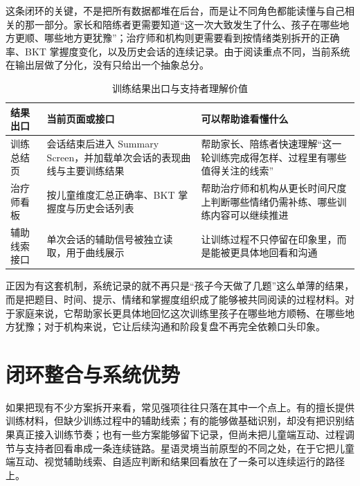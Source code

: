 这条闭环的关键，不是把所有数据都堆在后台，而是让不同角色都能读懂与自己相关的那一部分。家长和陪练者更需要知道“这一次大致发生了什么、孩子在哪些地方更顺、哪些地方更犹豫”；治疗师和机构则更需要看到按情绪类别拆开的正确率、BKT 掌握度变化，以及历史会话的连续记录。由于阅读重点不同，当前系统在输出层做了分化，没有只给出一个抽象总分。

\begin{table}[H]
\centering
\caption{训练结果出口与支持者理解价值}
\small
\begin{tabularx}{0.96\textwidth}{>{\raggedright\arraybackslash}p{} >{\raggedright\arraybackslash}p{} X}
\toprule
结果出口 & 当前页面或接口 & 可以帮助谁看懂什么 \\
\midrule
训练总结页 & 会话结束后进入 Summary Screen，并加载单次会话的表现曲线与主要训练结果 & 帮助家长、陪练者快速理解“这一轮训练完成得怎样、过程里有哪些值得关注的线索” \\
治疗师看板 & 按儿童维度汇总正确率、BKT 掌握度与历史会话列表 & 帮助治疗师和机构从更长时间尺度上判断哪些情绪仍需补练、哪些训练内容可以继续推进 \\
辅助线索接口 & 单次会话的辅助信号被独立读取，用于曲线展示 & 让训练过程不只停留在印象里，而是能被更具体地回看和沟通 \\
\bottomrule
\end{tabularx}
\end{table}

正因为有这套机制，系统记录的就不再只是“孩子今天做了几题”这么单薄的结果，而是把题目、时间、提示、情绪和掌握度组织成了能够被共同阅读的过程材料。对于家庭来说，它帮助家长更具体地回忆这次训练里孩子在哪些地方顺畅、在哪些地方犹豫；对于机构来说，它让后续沟通和阶段复盘不再完全依赖口头印象。

\section{闭环整合与系统优势}
如果把现有不少方案拆开来看，常见强项往往只落在其中一个点上。有的擅长提供训练材料，但缺少训练过程中的辅助线索；有的能够做基础识别，却没有把识别结果真正接入训练节奏；也有一些方案能够留下记录，但尚未把儿童端互动、过程调节与支持者回看串成一条连续链路。星语灵境当前原型的不同之处，在于它把儿童端互动、视觉辅助线索、自适应判断和结果回看放在了一条可以连续运行的路径上。

